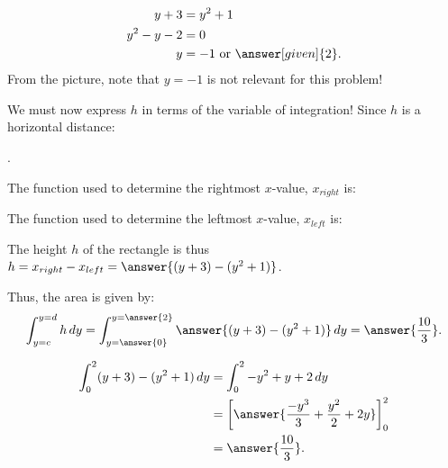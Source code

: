 \documentclass{ximera}
\begin{document}
\begin{exercise}
\begin{exercise}
\begin{exercise}
\begin{exercise}
\begin{hint}
   \begin{align*}
    y+3 &= y^2 +1\\
  y^2-y-2 &= 0\\
    y &= -1 \text{ or }\answer[given]{2}.
  \end{align*}
  From the picture, note that $y=-1$ is not relevant for this problem!
\end{hint}

We must now express $h$ in terms of the variable of integration!  Since $h$ is a horizontal distance: 

\begin{multipleChoice}
.
\end{multipleChoice}

\begin{exercise}

The function used to determine the rightmost $x$-value, $x_{right}$ is:
\begin{multipleChoice}
\end{multipleChoice}

The function used to determine  the leftmost $x$-value, $x_{left}$ is:
\begin{multipleChoice}
\end{multipleChoice}

The height $h$ of the rectangle is thus $h=x_{right}-x_{left} = \answer{(y+3)-(y^2+1)}$.


\begin{exercise}

Thus, the area is given by:
  \[
 \int_{y=c}^{y=d} h \d y =  \int_{y=\answer{0}}^{y=\answer{2}} \answer{(y+3) - (y^2+1)} \d y = \answer{\frac{10}{3}}.
  \]
  \begin{hint}
    \begin{align*}
      \int_0^2 (y+3) - (y^2+1) \d y &= \int_0^2 -y^2+y+2 \d y\\
      &=\eval{\answer{\frac{-y^3}{3} + \frac{y^2}{2}+2y}}_0^2\\
      &=\answer{\frac{10}{3}}.
    \end{align*}
  \end{hint}

\end{exercise}
\end{exercise}
\end{exercise}
\end{exercise}
\end{exercise}
\end{exercise}
\end{document}
